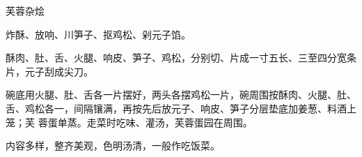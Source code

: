 \begin{recipe}{芙蓉杂烩}

\ingredients


\preparation

\step 炸酥、放响、川笋子、抠鸡松、剁元子馅。

\step 酥肉、肚、舌、火腿、响皮、笋子、鸡松，分别切、片成一寸五长、三至四分宽条
片，元子刮成尖刀。

\step 碗底用火腿、肚、舌各一片摆好，两头各摆鸡松一片，碗周围按酥肉、火腿、肚、
舌、鸡松各一，间隔镶满，再按先后放元子、响皮、笋子分层垫底加姜葱、料酒上笼；芙
蓉蛋单蒸。走菜时吃味、灌汤，芙蓉蛋园在周围。

\features

内容多样，整齐美观，色明汤清，一般作吃饭菜。

\end{recipe}


